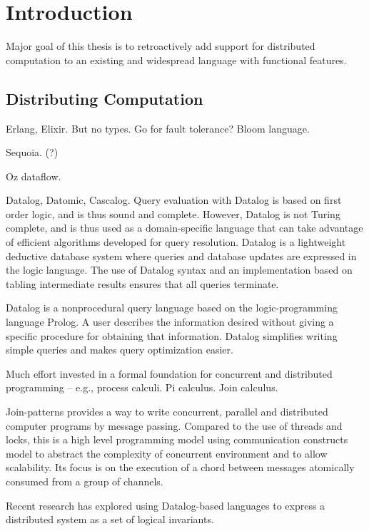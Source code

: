 \chapter*{Introduction}

Major goal of this thesis is to retroactively add support for distributed
computation to an existing and widespread language with functional features.

\section{Distributing Computation}

Erlang, Elixir. But no types. Go for fault tolerance? Bloom language.

Sequoia. (?)

Oz dataflow.

Datalog, Datomic, Cascalog. Query evaluation with Datalog is based on first
order logic, and is thus sound and complete. However, Datalog is not Turing
complete, and is thus used as a domain-specific language that can take advantage
of efficient algorithms developed for query resolution. Datalog is a lightweight
deductive database system where queries and database updates are expressed in
the logic language. The use of Datalog syntax and an implementation based on
tabling intermediate results ensures that all queries terminate.

Datalog is a nonprocedural query language based on the logic-programming
language Prolog.  A user describes the information desired without giving a
specific procedure for obtaining that information. Datalog simplifies writing
simple queries and makes query optimization easier.  

Much effort invested in a formal foundation for concurrent and distributed
programming -- e.g., process calculi. Pi calculus. Join calculus.

Join-patterns provides a way to write concurrent, parallel and distributed
computer programs by message passing. Compared to the use of threads and locks,
this is a high level programming model using communication constructs model to
abstract the complexity of concurrent environment and to allow scalability. Its
focus is on the execution of a chord between messages atomically consumed from a
group of channels.

Recent research has explored using Datalog-based languages to express a
distributed system as a set of logical invariants.

